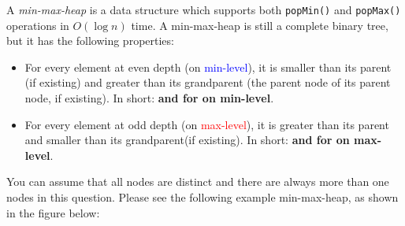 \setlength{\parskip}{0pt}
A \textit{min-max-heap} is a data structure which supports both \texttt{popMin()} and \texttt{popMax()} operations in $O(\log n)$ time. A min-max-heap is still a complete binary tree, but it has the following properties:

\begin{itemize}
    \item For every element at even depth (on \textcolor{blue}{min-level}), it is smaller than its parent (if existing) and greater than its grandparent (the parent node of its parent node, if existing). In short: \textbf{ and  for  on min-level}.
    \item For every element at odd depth (on \textcolor{red}{max-level}), it is greater than its parent and smaller than its grandparent(if existing). In short: \textbf{ and  for  on max-level}.
\end{itemize} 

You can assume that all nodes are distinct and there are always more than one nodes in this question. Please see the following example min-max-heap, as shown in the figure below:

\noindent\begin{minipage}{\linewidth}
\centering
{}
\end{minipage}
\vspace{-0.3in}


